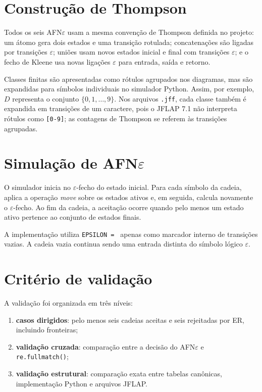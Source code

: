 \documentclass[12pt,a4paper,oneside]{report}
\begin{document}
\section{Construção de Thompson}

Todos os seis AFN$\varepsilon$ usam a mesma convenção de Thompson definida no projeto: um átomo gera dois estados e uma transição rotulada; concatenações são ligadas por transições $\varepsilon$; uniões usam novos estados inicial e final com transições $\varepsilon$; e o fecho de Kleene usa novas ligações $\varepsilon$ para entrada, saída e retorno.

Classes finitas são apresentadas como rótulos agrupados nos diagramas, mas são expandidas para símbolos individuais no simulador Python. Assim, por exemplo, $D$ representa o conjunto $\{0,1,\ldots,9\}$. Nos arquivos \texttt{.jff}, cada classe também é expandida em transições de um caractere, pois o JFLAP 7.1 não interpreta rótulos como \texttt{[0-9]}; as contagens de Thompson se referem às transições agrupadas.

\section{\texorpdfstring{Simulação de AFN$\varepsilon$}{Simulação de AFN epsilon}}

O simulador inicia no $\varepsilon$-fecho do estado inicial. Para cada símbolo da cadeia, aplica a operação \textit{move} sobre os estados ativos e, em seguida, calcula novamente o $\varepsilon$-fecho. Ao fim da cadeia, a aceitação ocorre quando pelo menos um estado ativo pertence ao conjunto de estados finais.

A implementação utiliza \texttt{EPSILON = \textquotedbl{}\textquotedbl{}} apenas como marcador interno de transições vazias. A cadeia vazia continua sendo uma entrada distinta do símbolo lógico $\varepsilon$.

\section{Critério de validação}

A validação foi organizada em três níveis:

\begin{enumerate}
    \item \textbf{casos dirigidos}: pelo menos seis cadeias aceitas e seis rejeitadas por ER, incluindo fronteiras;
    \item \textbf{validação cruzada}: comparação entre a decisão do AFN$\varepsilon$ e \texttt{re.fullmatch()};
    \item \textbf{validação estrutural}: comparação exata entre tabelas canônicas, implementação Python e arquivos JFLAP.
\end{enumerate}
\end{document}
